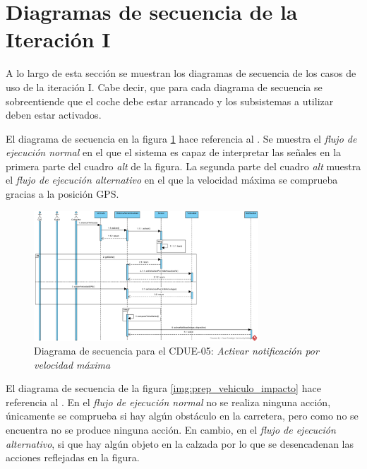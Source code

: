 \section{Diagramas de secuencia de la Iteración I}

\par A lo largo de esta sección se muestran los diagramas de secuencia de los casos de uso de la iteración I. Cabe decir, que para cada diagrama de secuencia se sobreentiende que el coche debe estar arrancado y los subsistemas a utilizar deben estar activados.

\par El diagrama de secuencia  en la figura \ref{img:notif_velocidad_max} hace referencia al . Se muestra el \textit{flujo de ejecución normal} en el que el sistema es capaz de interpretar las señales en la primera parte del cuadro \textit{alt} de la figura. La segunda parte del cuadro \textit{alt} muestra el \textit{flujo de ejecución alternativo} en el que la velocidad máxima se comprueba gracias a la posición GPS.

\begin{figure}[h]
  \begin{center}
    \includegraphics[width=0.75\textwidth]{./img/diagramas_de_secuencia/CDUE-05.png}
  \end{center}
  \caption{Diagrama de secuencia para el CDUE-05: \textit{Activar notificación por velocidad máxima}}
  \label{img:notif_velocidad_max}
\end{figure}

\clearpage

\par El diagrama de secuencia de la figura \ref{img:prep_vehiculo_impacto} hace referencia al . En el \textit{flujo de ejecución normal} no se realiza ninguna acción, únicamente se comprueba si hay algún obstáculo en la carretera, pero como no se encuentra no se produce ninguna acción. En cambio, en el \textit{flujo de ejecución alternativo}, si que hay algún objeto en la calzada por lo que se desencadenan las acciones reflejadas en la figura.

